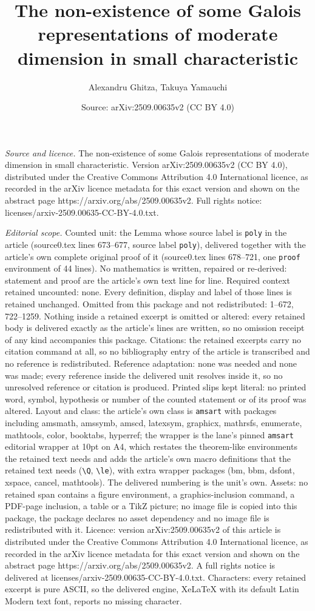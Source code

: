 \documentclass[10pt,a4paper]{amsart}
\title[The non-existence of some Galois representations of moderate]{The non-existence of some Galois representations of moderate dimension in small characteristic}
\author{Alexandru Ghitza, Takuya Yamauchi}
\date{Source: arXiv:2509.00635v2 (CC BY 4.0)}
\begin{document}
\maketitle

\noindent\emph{Source and licence.} The non-existence of some Galois representations of moderate dimension in small characteristic. Version arXiv:2509.00635v2 (CC BY 4.0), distributed under the Creative Commons Attribution 4.0 International licence, as recorded in the arXiv licence metadata for this exact version and shown on the abstract page https://arxiv.org/abs/2509.00635v2. Full rights notice: licenses/arxiv-2509.00635-CC-BY-4.0.txt.\par\smallskip

\noindent\textit{Editorial scope.} Counted unit: the Lemma whose source label is \texttt{poly} in the article (source0.tex lines 673--677, source label \texttt{poly}), delivered together with the article's own complete original proof of it (source0.tex lines 678--721, one \texttt{proof} environment of 44 lines). No mathematics is written, repaired or re-derived: statement and proof are the article's own text line for line. Required context retained uncounted: none. Every definition, display and label of those lines is retained unchanged. Omitted from this package and not redistributed: 1--672, 722--1259. Nothing inside a retained excerpt is omitted or altered: every retained body is delivered exactly as the article's lines are written, so no omission receipt of any kind accompanies this package. Citations: the retained excerpts carry no citation command at all, so no bibliography entry of the article is transcribed and no reference is redistributed. Reference adaptation: none was needed and none was made; every reference inside the delivered unit resolves inside it, so no unresolved reference or citation is produced. Printed slips kept literal: no printed word, symbol, hypothesis or number of the counted statement or of its proof was altered. Layout and class: the article's own class is \texttt{amsart} with packages including amsmath, amssymb, amscd, latexsym, graphicx, mathrsfs, enumerate, mathtools, color, booktabs, hyperref; the wrapper is the lane's pinned \texttt{amsart} editorial wrapper at 10pt on A4, which restates the theorem-like environments the retained text needs and adds the article's own macro definitions that the retained text needs (\texttt{\textbackslash Q}, \texttt{\textbackslash le}), with extra wrapper packages (bm, bbm, dsfont, xspace, cancel, mathtools). The delivered numbering is the unit's own. Assets: no retained span contains a figure environment, a graphics-inclusion command, a PDF-page inclusion, a table or a TikZ picture; no image file is copied into this package, the package declares no asset dependency and no image file is redistributed with it. Licence: version arXiv:2509.00635v2 of this article is distributed under the Creative Commons Attribution 4.0 International licence, as recorded in the arXiv licence metadata for this exact version and shown on the abstract page https://arxiv.org/abs/2509.00635v2. A full rights notice is delivered at licenses/arxiv-2509.00635-CC-BY-4.0.txt. Characters: every retained excerpt is pure ASCII, so the delivered engine, XeLaTeX with its default Latin Modern text font, reports no missing character.
\end{document}
